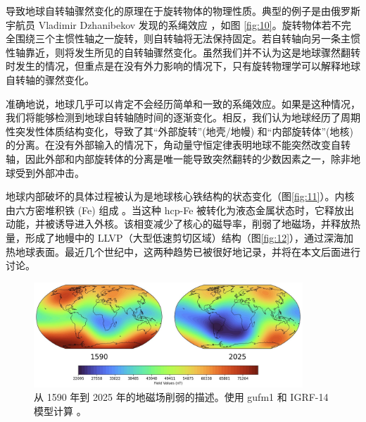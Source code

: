 \documentclass[10pt,twocolumn,letterpaper]{article}
\begin{document}
导致地球自转轴骤然变化的原理在于旋转物体的物理性质。典型的例子是由俄罗斯宇航员 Vladimir Dzhanibekov 发现的系绳效应 \cite{37}，如图 \ref{fig:10}。旋转物体若不完全围绕三个主惯性轴之一旋转，则自转轴将无法保持固定。若自转轴向另一条主惯性轴靠近，则将发生所见的自转轴骤然变化。虽然我们并不认为这是地球骤然翻转时发生的情况，但重点是在没有外力影响的情况下，只有旋转物理学可以解释地球自转轴的骤然变化。

准确地说，地球几乎可以肯定不会经历简单和一致的系绳效应。如果是这种情况，我们将能够检测到地球自转轴随时间的逐渐变化。相反，我们认为地球经历了周期性突发性体质结构变化，导致了其“外部旋转”(地壳/地幔) 和“内部旋转体”(地核) 的分离。在没有外部输入的情况下，角动量守恒定律表明地球不能突然改变自转轴，因此外部和内部旋转体的分离是唯一能导致突然翻转的少数因素之一，除非地球受到外部冲击。

地球内部破坏的具体过程被认为是地球核心铁结构的状态变化（图\ref{fig:11}）。内核由六方密堆积铁 (Fe) 组成 \cite{141}。当这种 hcp-Fe 被转化为液态金属状态时，它释放出动能，并被诱导进入外核。该相变减少了核心的磁导率，削弱了地磁场，并释放热量，形成了地幔中的 LLVP（大型低速剪切区域）结构（图\ref{fig:12}）\cite{38}，通过深海加热地球表面。最近几个世纪中，这两种趋势已被很好地记录，并将在本文后面进行讨论。

\begin{figure}[t]
\begin{center}
\includegraphics[width=0.9\textwidth]{saa.jpg}
\end{center}
   \caption{从 1590 年到 2025 年的地磁场削弱的描述。使用 gufm1 和 IGRF-14 模型计算 \cite{125,126}。}
\label{fig:14}
\end{figure}
\end{document}
